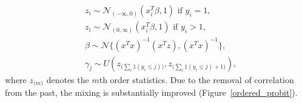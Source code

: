\documentclass[10pt]{article}
\begin{document}
\begin{equation}
	\begin{aligned}
	&	z_i \sim  {\mathcal N}_{(-\infty,0)} (x^T_i\beta,1) \text{ if $y_i=1$},\\
	&	z_i \sim {\mathcal N}_{(0,\infty)} (x^T_i\beta,1) \text{ if $y_i>1$},\\
	&	\beta \sim \mathcal{N} \{   (x^Tx)^{-1}(x^Tz),(x^Tx)^{-1}  \} ,\\
	& \gamma_j\sim U(  z_{\big(\sum_i 1(y_i \le j) \big)}, z_{\big(\sum_i 1(y_i \le j)+1 \big)}), 
	\end{aligned}
\end{equation}
where $z_{\big(m\big)}$ denotes the $m$th order statistics. Due to the removal of correlation from the past, the mixing is substantially improved (Figure~\ref{ordered_probit}).
\end{document}
